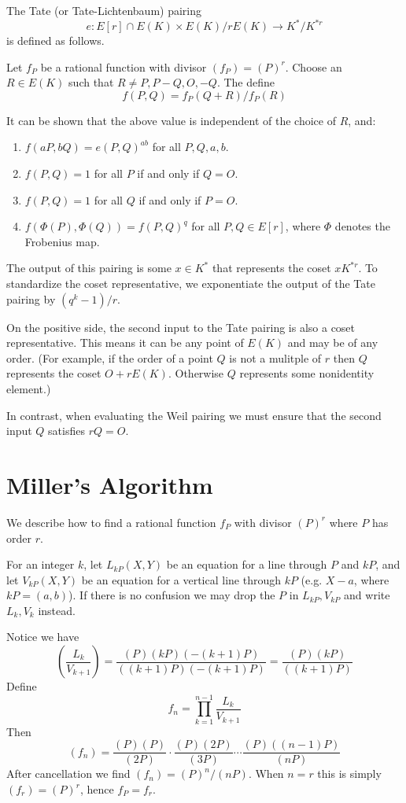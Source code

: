 The Tate (or Tate-Lichtenbaum) pairing
\[
e : E[r] \cap E(K) \times
E(K) / r E(K) \rightarrow
K^* / K^{*r}
\]
is defined as follows.

Let $f_P$ be a rational function with divisor $(f_P) = (P)^r$.
Choose an $R\in E(K)$ such that $R \ne P, P-Q, O, -Q$. The define
\[
f(P, Q) = f_P (Q + R) / f_P (R)
\]

It can be shown that the above value is independent of the choice of $R$,
and:
\begin{enumerate}
\item
$f(a P, b Q) = e(P, Q)^{a b}$ for all $P, Q, a, b$.
\item
$f(P,Q) = 1$ for all $P$ if and only if $Q = O$.
\item
$f(P,Q) = 1$ for all $Q$ if and only if $P = O$.
\item
$f(\Phi(P),\Phi(Q)) = f(P,Q)^{q}$ for all $P,Q \in E[r]$,
where $\Phi$ denotes the Frobenius map.
\end{enumerate}

The output of this pairing is some $x \in K^*$
that represents the coset $x K^{*r}$. To standardize the coset
representative, we exponentiate the output of the Tate pairing
by $(q^k - 1) / r$.

On the positive side, the second input to the Tate pairing is also a coset
representative. This means it can be any point of $E(K)$ and may
be of any order. (For example,
if the order of a point $Q$ is not a mulitple of $r$ then $Q$ represents
the coset $O + r E(K)$. Otherwise $Q$ represents some nonidentity
element.)

In contrast, when evaluating the Weil pairing we must ensure that the second
input $Q$ satisfies $r Q = O$.

\section {Miller's Algorithm}

We describe how to find a rational function $f_P$ with divisor
$(P)^r$ \cite{miller} where $P$ has order $r$.

For an integer $k$,
let $L_{kP}(X,Y)$ be an equation for a line through $P$ and $kP$,
and let
$V_{kP}(X,Y)$ be an equation for a vertical line through $kP$ (e.g.
$X - a$, where $kP = (a, b)$).
If there is no confusion we may drop the $P$ in $L_{kP}, V_{kP}$ and write
$L_k, V_k$ instead.

Notice we have
\[
\left (
\frac{L_k}{V_{k+1}}
\right )
= \frac{(P)(kP)(-(k+1)P)}{((k+1)P)(-(k+1)P)}
= \frac{(P)(kP)}{((k+1)P)}
\]
Define
\[ f_n = \prod_{k=1}^{n-1} \frac{L_k}{V_{k+1}} \]
Then
\[ (f_n) =
\frac{(P)(P)}{(2P)}
\cdot
\frac{(P)(2P)}{(3P)}
\cdots
\frac{(P)((n-1)P)}{(nP)}
\]
After cancellation we find $(f_n) = (P)^n / (nP)$. When $n = r$ this
is simply $(f_r) = (P)^r$, hence $f_P = f_r$.

